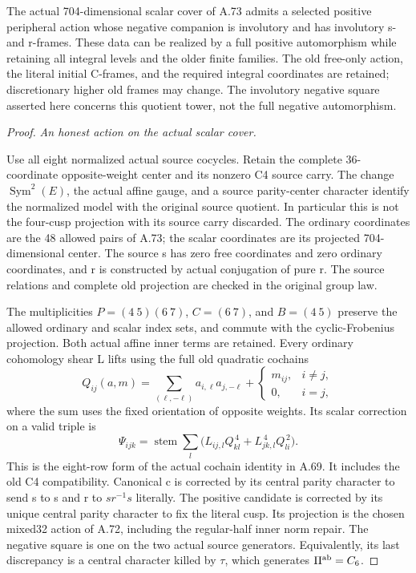 The actual 704-dimensional scalar cover of A.73 admits a selected
positive peripheral action whose negative companion is involutory
and has involutory s- and r-frames. These data can be realized by a
full positive automorphism while retaining all integral levels and
the older finite families. The old free-only action, the literal
initial C-frames, and the required integral coordinates are retained;
discretionary higher old frames may change. The involutory negative
square asserted here concerns this quotient tower, not the full
negative automorphism.

\begin{proof}
\emph{An honest action on the actual scalar cover.}\par
Use all eight normalized actual source cocycles. Retain the complete
36-coordinate opposite-weight center and its nonzero C4 source carry.
The change \(\operatorname{Sym}^2(E)\), the actual affine gauge,
and a source parity-center character identify the normalized model
with the original source quotient. In particular this is not the
four-cusp projection with its source carry discarded. The ordinary
coordinates are the 48 allowed pairs of A.73; the scalar coordinates
are its projected 704-dimensional center. The source s has zero free
coordinates and zero ordinary coordinates, and r is constructed by
actual conjugation of pure r. The source relations and complete old
projection are checked in the original group law.

The multiplicities \(P=(4\ 5)(6\ 7)\), \(C=(6\ 7)\), and
\(B=(4\ 5)\) preserve the allowed ordinary and scalar index sets,
and commute with the cyclic-Frobenius projection. Both actual affine
inner terms are retained. Every ordinary cohomology shear L lifts
using the full old quadratic cochains
\[
 Q_{ij}(a,m)=\sum_{(\ell,-\ell)}a_{i,\ell}a_{j,-\ell}
             +\begin{cases}m_{ij},&i\ne j,\\0,&i=j,\end{cases}
\]
where the sum uses the fixed orientation of opposite weights. Its
scalar correction on a valid triple is
\[
 \Psi_{ijk}=
 \operatorname{stem}\sum_l
       \bigl(L_{ij,l}Q_{kl}^{\,4}+L_{jk,l}^{\,4}Q_{li}^{\,2}\bigr).
 \tag{A.75.1}
\]
This is the eight-row form of the actual cochain identity in A.69.
It includes the old C4 compatibility. Canonical c is corrected by
its central parity character to send s to s and r to
\(sr^{-1}s\) literally. The positive candidate is corrected by
its unique central parity character to fix the literal cusp. Its
projection is the chosen mixed32 action of A.72, including the
regular-half inner norm repair. The negative square is one on the
two actual source generators. Equivalently, its last discrepancy
is a central character killed by \(\tau\), which generates
\(\Pi^{\rm ab}=C_6\).


\end{proof}
